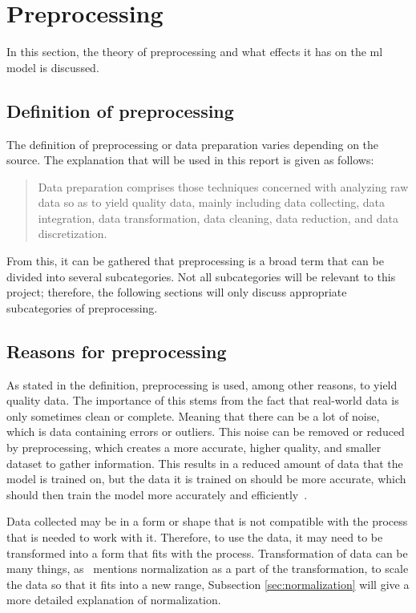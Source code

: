 \section{Preprocessing}\label{sec:preprocessing}
In this section, the theory of preprocessing and what effects it has on the \gls{ml} model is discussed.



\subsection{Definition of preprocessing}\label{subsec:preprocessing-definition}
The definition of preprocessing or data preparation varies depending on the source. The explanation that will be used in this report is given as follows:

\blockcquote{data-preparation-for-data-mining}{Data preparation comprises those techniques concerned with analyzing raw data so as to yield quality data, mainly including data collecting, data integration, data transformation, data cleaning, data reduction, and data discretization.}

From this, it can be gathered that preprocessing is a broad term that can be divided into several subcategories. Not all subcategories will be relevant to this project; therefore, the following sections will only discuss appropriate subcategories of preprocessing.


\subsection{Reasons for preprocessing}\label{subsec:preprocessing-reasons}
As stated in the definition, preprocessing is used, among other reasons, to yield quality data. The importance of this stems from the fact that real-world data is only sometimes clean or complete. Meaning that there can be a lot of noise, which is data containing errors or outliers. This noise can be removed or reduced by preprocessing, which creates a more accurate, higher quality, and smaller dataset to gather information. This results in a reduced amount of data that the model is trained on, but the data it is trained on should be more accurate, which should then train the model more accurately and efficiently~\cite{data-preparation-for-data-mining}.


Data collected may be in a form or shape that is not compatible with the process that is needed to work with it. Therefore, to use the data, it may need to be transformed into a form that fits with the process. Transformation of data can be many things, as~\cite{Data-preprocessing-for-flight-delays} mentions normalization as a part of the transformation, to scale the data so that it fits into a new range, Subsection \ref{sec:normalization} will give a more detailed explanation of normalization.



